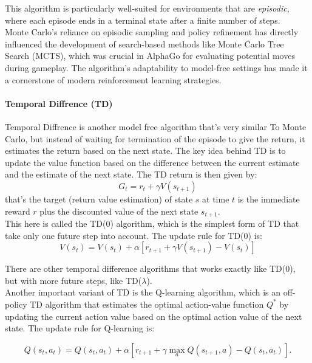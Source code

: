 This algorithm is particularly well-suited for environments that are
\emph{episodic}, where each episode ends in a terminal state after a finite
number of steps. \\ Monte Carlo's reliance on episodic sampling and policy
refinement has directly influenced the development of search-based methods like
Monte Carlo Tree Search (MCTS), which was crucial in AlphaGo for evaluating
potential moves during gameplay. The algorithm's adaptability to model-free
settings has made it a cornerstone of modern reinforcement learning strategies.

\paragraph{Temporal Diffrence (TD)}

Temporal Diffrence is another model free algorithm that's very similar To Monte
Carlo, but instead of waiting for termination of the episode to give the
return, it estimates the return based on the next state. The key idea behind TD
is to update the value function based on the difference between the current
estimate and the estimate of the next state. The TD return is then given by:
\begin{equation}
    G_t = r_t + \gamma V(s_{t+1})
\end{equation}
that's the target (return value estimation) of state $s$ at time $t$ is the immediate reward $r$ plus the
discounted value of the next state $s_{t+1}$.\\
This here is called the TD(0) algorithm, which is the simplest form of TD
that take only one future step into account. The update rule for TD(0) is:
\begin{equation}
    V(s_t) = V(s_t) + \alpha [r_{t+1} + \gamma V(s_{t+1}) - V(s_t)]
\end{equation}

There are other temporal difference algorithms that works exactly like TD(0),
but with more future steps, like TD($\lambda$). \\

Another important variant of TD is the Q-learning algorithm, which is an
off-policy TD algorithm that estimates the optimal action-value function $Q^*$
by updating the current action value based on the optimal action value of the
next state. The update rule for Q-learning is:

\begin{equation}
    Q(s_t, a_t) = Q(s_t, a_t) + \alpha[r_{t+1} + \gamma \max_a Q(s_{t+1}, a) - Q(s_t, a_t)] .
\end{equation}

